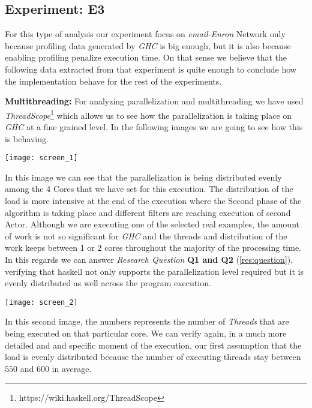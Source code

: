 \documentclass[preprint]{elsarticle}
\begin{document}
\subsection{\textbf{Experiment: E3}}

For this type of analysis our experiment focus on \textit{email-Enron} Network only because profiling data generated by \textit{GHC} is big enough, but it is also because enabling profiling penalize execution time. 
On that sense we believe that the following data extracted from that experiment is quite enough to conclude how the implementation behave for the rest of the experiments.

\textbf{Multithreading:} For analyzing parallelization and multithreading we have used \textit{ThreadScope}\footnote{https://wiki.haskell.org/ThreadScope} which allows us to see how the parallelization is taking place
on \textit{GHC} at a fine grained level. In the following images we are going to see how this is behaving.

\begin{minipage}[t]{\linewidth}
  \texttt{[image: screen\_1]}
  \captionsetup{type=figure}
  \label{fig:3}
\end{minipage}

In this image we can see that the parallelization is being distributed evenly among the 4 Cores that we have set for this execution.
The distribution of the load is more intensive at the end of the execution where the Second phase of the algorithm is taking place and different filters are reaching execution of second Actor.
Although we are executing one of the selected real examples, the amount of work is not so significant for \textit{GHC} and the threads and distribution of the work keeps between 1 or 2 cores throughout 
the majority of the processing time. In this regards we can answer \emph{Research Question} \textbf{Q1 and Q2} (\autoref{res:question}), verifying that \acrshort{haskell} not only supports the parallelization level required but it is evenly distributed as well across the program execution.


\begin{minipage}[t]{\linewidth}
  \texttt{[image: screen\_2]}
  \captionsetup{type=figure}
  \label{fig:4}
\end{minipage}

In this second image, the numbers represents the number of \textit{Threads} that are being executed on that particular core.
We can verify again, in a much more detailed and and specific moment of the execution, our first assumption that the load is evenly distributed because the number of executing threads stay between $550$ and $600$
in average.
\end{document}
